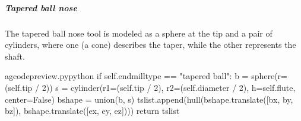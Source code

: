 \documentclass{ltxdoc}
\begin{document}
%
%
%
%

\subparagraph{Tapered ball nose}

The tapered ball nose tool is modeled as a sphere at the tip and a pair of cylinders, where one (a cone) describes the taper, while the other represents the shaft.

\lstset{firstnumber=\thegcpy}
\begin{writecode}{a}{gcodepreview.py}{python}
        if self.endmilltype == "tapered ball":
            b = sphere(r=(self.tip / 2))
            s = cylinder(r1=(self.tip / 2), r2=(self.diameter / 2), h=self.flute, center=False)
            bshape = union(b, s)
            tslist.append(hull(bshape.translate([bx, by, bz]), bshape.translate([ex, ey, ez])))
            return tslist

\end{writecode}
\addtocounter{gcpy}{7}

%
%
%
\end{document}
